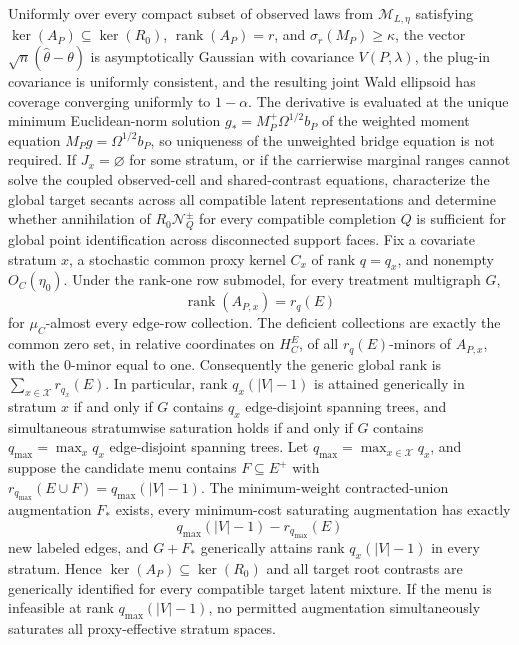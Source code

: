 Uniformly over every compact subset of observed laws from \(\mathcal M_{L,\eta}\) satisfying \(\ker(A_P)\subseteq\ker(R_0)\), \(\operatorname{rank}(A_P)=r\), and \(\sigma_r(M_P)\ge\kappa\), the vector \(\sqrt n(\widehat\theta-\theta)\) is asymptotically Gaussian with covariance \(V(P,\lambda)\), the plug-in covariance is uniformly consistent, and the resulting joint Wald ellipsoid has coverage converging uniformly to \(1-\alpha\).  The derivative is evaluated at the unique minimum Euclidean-norm solution \(g_*=M_P^+\Omega^{1/2}b_P\) of the weighted moment equation \(M_Pg=\Omega^{1/2}b_P\), so uniqueness of the unweighted bridge equation is not required.
If \(J_x=\varnothing\) for some stratum, or if the carrierwise marginal ranges cannot solve the coupled observed-cell and shared-contrast equations, characterize the global target secants across all compatible latent representations and determine whether annihilation of \(R_0\mathcal N_Q^{\pm}\) for every compatible completion \(Q\) is sufficient for global point identification across disconnected support faces.
Fix a covariate stratum \(x\), a stochastic common proxy kernel \(C_x\) of rank \(q=q_x\), and nonempty \(O_C(\eta_0)\).  Under the rank-one row submodel, for every treatment multigraph \(G\),
\[
\operatorname{rank}(A_{P,x})=r_q(E)
\]
for \(\mu_C\)-almost every edge-row collection.  The deficient collections are exactly the common zero set, in relative coordinates on \(H_C^E\), of all \(r_q(E)\)-minors of \(A_{P,x}\), with the \(0\)-minor equal to one.  Consequently the generic global rank is \(\sum_{x\in\mathcal X}r_{q_x}(E)\).  In particular, rank \(q_x(|V|-1)\) is attained generically in stratum \(x\) if and only if \(G\) contains \(q_x\) edge-disjoint spanning trees, and simultaneous stratumwise saturation holds if and only if \(G\) contains \(q_{\max}=\max_xq_x\) edge-disjoint spanning trees.
Let \(q_{\max}=\max_{x\in\mathcal X}q_x\), and suppose the candidate menu contains \(F\subseteq E^+\) with \(r_{q_{\max}}(E\cup F)=q_{\max}(|V|-1)\).  The minimum-weight contracted-union augmentation \(F_*\) exists, every minimum-cost saturating augmentation has exactly
\[
q_{\max}(|V|-1)-r_{q_{\max}}(E)
\]
new labeled edges, and \(G+F_*\) generically attains rank \(q_x(|V|-1)\) in every stratum.  Hence \(\ker(A_P)\subseteq\ker(R_0)\) and all target root contrasts are generically identified for every compatible target latent mixture.  If the menu is infeasible at rank \(q_{\max}(|V|-1)\), no permitted augmentation simultaneously saturates all proxy-effective stratum spaces.

